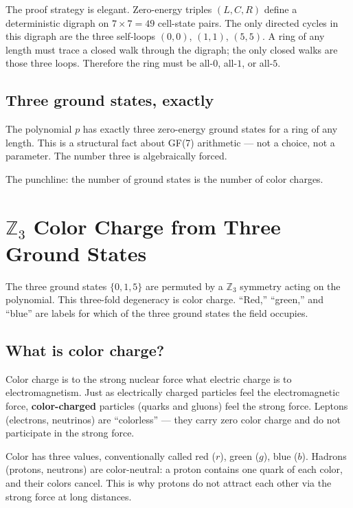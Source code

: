 \documentclass[11pt,a4paper]{article}
\newcommand{\term}[1]{\textbf{#1}}
\begin{document}
The proof strategy is elegant.  Zero-energy triples $(L,C,R)$ define a
deterministic digraph on $7\times7 = 49$ cell-state pairs.  The only
directed cycles in this digraph are the three self-loops $(0,0)$, $(1,1)$,
$(5,5)$.  A ring of any length must trace a closed walk through the digraph;
the only closed walks are those three loops.  Therefore the ring must be
all-$0$, all-$1$, or all-$5$.

\subsection{Three ground states, exactly}

The polynomial $p$ has exactly three zero-energy ground states for a ring
of any length.  This is a structural fact about GF(7) arithmetic --- not
a choice, not a parameter.  The number three is algebraically forced.

The punchline: the number of ground states is the number of color charges.

\section{$\mathbb{Z}_3$ Color Charge from Three Ground States}
\label{sec:color}

\begin{tcolorbox}[colback=boxblue,colframe=blue!40!black,title=Key idea]
The three ground states $\{0,1,5\}$ are permuted by a $\mathbb{Z}_3$
symmetry acting on the polynomial.  This three-fold degeneracy is color
charge.  ``Red,'' ``green,'' and ``blue'' are labels for which of the three
ground states the field occupies.
\end{tcolorbox}

\subsection{What is color charge?}

Color charge is to the strong nuclear force what electric charge is to
electromagnetism.  Just as electrically charged particles feel the
electromagnetic force, \term{color-charged} particles (quarks and gluons)
feel the strong force.  Leptons (electrons, neutrinos) are ``colorless'' ---
they carry zero color charge and do not participate in the strong force.

Color has three values, conventionally called red ($r$), green ($g$),
blue ($b$).  Hadrons (protons, neutrons) are color-neutral: a proton
contains one quark of each color, and their colors cancel.  This is why
protons do not attract each other via the strong force at long distances.
\end{document}
